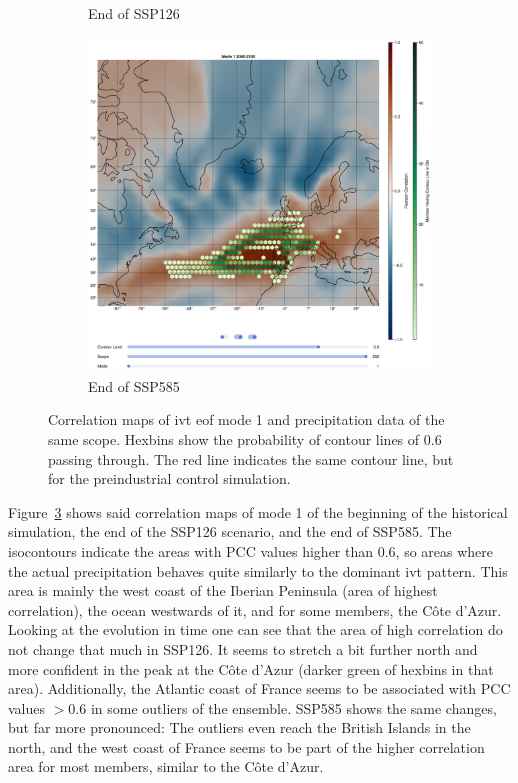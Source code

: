 \begin{figure}[!htb]
\begin{subfigure}[b]{0.32\textwidth}
    \caption{End of SSP126} 
    \label{fig:ivt eof pr cor ssp126 mode1}
  \end{subfigure}
  \begin{subfigure}[b]{0.32\textwidth}
    \includegraphics[width=\textwidth]{figures/ivt_pr_cor_mode1_ssp585_hexbin.png}
    \caption{End of SSP585}
    \label{fig:ivt eof pr cor ssp585 mode1}
  \end{subfigure}
  \caption{Correlation maps of \ac{ivt} \ac{eof} mode 1 and precipitation data of the same scope. Hexbins show the probability of contour lines of $0.6$ passing through. The red line indicates the same contour line, but for the preindustrial control simulation.}
  \label{fig:ivt eof pr cor mode1}
\end{figure}


Figure~\ref{fig:ivt eof pr cor mode1} shows said correlation maps of mode 1 of the beginning of the historical simulation, the end of the SSP126 scenario, and the end of SSP585. 
The isocontours indicate the areas with PCC values higher than $0.6$, so areas where the actual precipitation behaves quite similarly to the dominant \ac{ivt} pattern. 
This area is mainly the west coast of the Iberian Peninsula (area of highest correlation), the ocean westwards of it, and for some members, the Côte d'Azur. 
Looking at the evolution in time one can see that the area of high correlation do not change that much in SSP126. 
It seems to stretch a bit further north and more confident in the peak at the Côte d'Azur (darker green of hexbins in that area). 
Additionally, the Atlantic coast of France seems to be associated with PCC values $>0.6$ in some outliers of the ensemble. 
SSP585 shows the same changes, but far more pronounced: The outliers even reach the British Islands in the north, and the west coast of France seems to be part of the higher correlation area for most members, similar to the Côte d'Azur.

